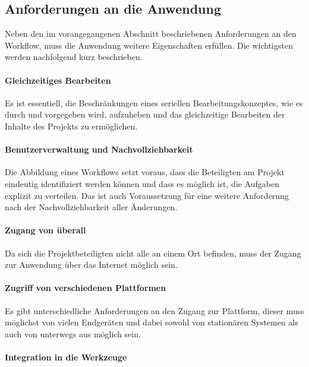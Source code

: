 \pagebreak

\subsection{Anforderungen an die Anwendung}\label{l:anforderungen}

Neben den im vorangegangenen Abschnitt beschriebenen Anforderungen an den Workflow, muss die Anwendung weitere Eigenschaften erfüllen. Die wichtigsten werden nachfolgend kurz beschrieben.

\paragraph{Gleichzeitiges Bearbeiten}

Es ist essentiell, die Beschränkungen eines seriellen Bearbeitungskonzeptes, wie es durch  und  vorgegeben wird, aufzuheben und das gleichzeitige Bearbeiten der Inhalte des Projekts zu ermöglichen. 

\paragraph{Benutzerverwaltung und Nachvollziehbarkeit}

Die Abbildung eines Workflows setzt voraus, dass die Beteiligten am Projekt eindeutig identifiziert werden können und dass es möglich ist, die Aufgaben explizit zu verteilen. Das ist auch Voraussetzung für eine weitere Anforderung nach der Nachvollziehbarkeit aller Änderungen.

\paragraph{Zugang von überall}

Da sich die Projektbeteiligten nicht alle an einem Ort befinden, muss der Zugang zur Anwendung über das Internet möglich sein.

\paragraph{Zugriff von verschiedenen Plattformen}

Es gibt unterschiedliche Anforderungen an den Zugang zur Plattform, dieser muss möglichst von vielen Endgeräten und dabei sowohl von stationären Systemen als auch von unterwegs aus möglich sein.

\paragraph{Integration in die Werkzeuge}

